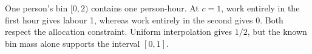 \begin{example}
\label{ex:binning-cutoff}
One person's bin $[0,2)$ contains one person-hour. At $c=1$, work entirely in the first hour gives labour 1, whereas work entirely in the second gives 0. Both respect the allocation constraint. Uniform interpolation gives $1/2$, but the known bin mass alone supports the interval $[0,1]$.
\end{example}
